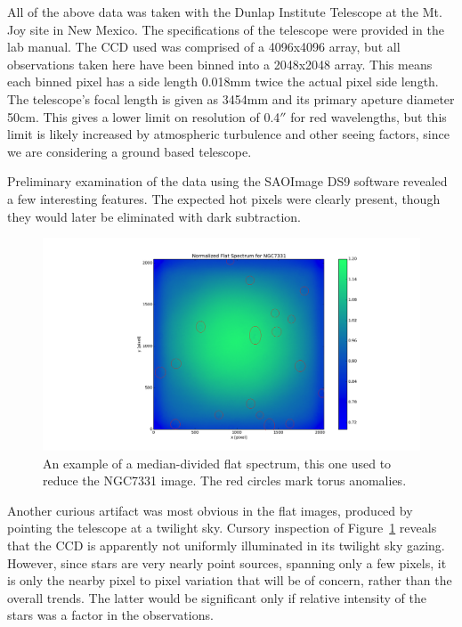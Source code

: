 \documentclass[a4paper,12pt]{article}
\begin{document}
All of the above data was taken with the Dunlap Institute Telescope at the Mt. Joy site in New Mexico. The specifications of the telescope were provided in the lab manual. The CCD used was comprised of a 4096x4096 array, but all observations taken here have been binned into a 2048x2048 array. This means each binned pixel has a side length 0.018mm twice the actual pixel side length. The telescope's focal length is given as 3454mm and its primary apeture diameter 50cm. This gives a lower limit on resolution of 0.4$''$ for red wavelengths, but this limit is likely increased by atmospheric turbulence and other seeing factors, since we are considering a ground based telescope.

Preliminary examination of the data using the SAOImage DS9 software revealed a few interesting features. The expected hot pixels were clearly present, though they would later be eliminated with dark subtraction. 

\begin{figure}[!htbp]
  \centering
  \includegraphics[width=\linewidth]{flatspectrum2.png}
  \caption{An example of a median-divided flat spectrum, this one used to reduce the NGC7331 image. The red circles mark torus anomalies.}
  \label{fig:flatspec}
\end{figure}

Another curious artifact was most obvious in the flat images, produced by pointing the telescope at a twilight sky. Cursory inspection of Figure~\ref{fig:flatspec} reveals that the CCD is apparently not uniformly illuminated in its twilight sky gazing. However, since stars are very nearly point sources, spanning only a few pixels, it is only the nearby pixel to pixel variation that will be of concern, rather than the overall trends. The latter would be significant only if relative intensity of the stars was a factor in the observations.
\end{document}
